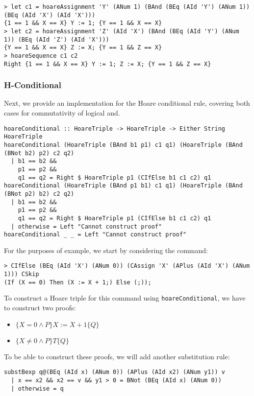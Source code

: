 \documentclass{article}
\begin{document}
\begin{lstlisting}
> let c1 = hoareAssignment 'Y' (ANum 1) (BAnd (BEq (AId 'Y') (ANum 1)) (BEq (AId 'X') (AId 'X')))
{1 == 1 && X == X} Y := 1; {Y == 1 && X == X}
> let c2 = hoareAssignment 'Z' (AId 'X') (BAnd (BEq (AId 'Y') (ANum 1)) (BEq (AId 'Z') (AId 'X')))
{Y == 1 && X == X} Z := X; {Y == 1 && Z == X}
> hoareSequence c1 c2
Right {1 == 1 && X == X} Y := 1; Z := X; {Y == 1 && Z == X}
\end{lstlisting}

\subsubsection{H-Conditional}

Next, we provide an implementation for the Hoare conditional rule, covering both cases for commutativity of logical and.

\begin{lstlisting}
hoareConditional :: HoareTriple -> HoareTriple -> Either String HoareTriple
hoareConditional (HoareTriple (BAnd b1 p1) c1 q1) (HoareTriple (BAnd (BNot b2) p2) c2 q2)
  | b1 == b2 &&
    p1 == p2 &&
    q1 == q2 = Right $ HoareTriple p1 (CIfElse b1 c1 c2) q1
hoareConditional (HoareTriple (BAnd p1 b1) c1 q1) (HoareTriple (BAnd (BNot p2) b2) c2 q2)
  | b1 == b2 &&
    p1 == p2 &&
    q1 == q2 = Right $ HoareTriple p1 (CIfElse b1 c1 c2) q1
  | otherwise = Left "Cannot construct proof"
hoareConditional _ _ = Left "Cannot construct proof"
\end{lstlisting}

For the purposes of example, we start by considering the command:

\begin{lstlisting}
> CIfElse (BEq (AId 'X') (ANum 0)) (CAssign 'X' (APlus (AId 'X') (ANum 1))) CSkip
(If (X == 0) Then (X := X + 1;) Else (;));
\end{lstlisting}

To construct a Hoare triple for this command using \texttt{hoareConditional}, we have to construct two proofs:

\begin{itemize}
\item $\{X = 0 \land P\} X := X + 1\{Q\}$
\item $\{X \neq 0 \land P\}T\{Q\}$
\end{itemize}

To be able to construct these proofs, we will add another substitution rule:

\begin{lstlisting}
substBexp q@(BEq (AId x) (ANum 0)) (APlus (AId x2) (ANum y1)) v
  | x == x2 && x2 == v && y1 > 0 = BNot (BEq (AId x) (ANum 0))
  | otherwise = q
\end{lstlisting}
\end{document}

